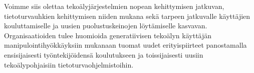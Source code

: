 \begin{otherlanguage}{finnish}
Voimme siis olettaa tekoälyjärjestelmien nopean kehittymisen jatkuvan, tietoturvauhkien kehittymisen niiden mukana sekä tarpeen jatkuvalle käyttäjien kouluttamiselle ja uusien puolustuskeinojen löytämiselle kasvavan. Organisaatioiden tulee huomioida generatiivisen tekoälyn käyttäjän manipulointihyökkäyksiin mukanaan tuomat uudet erityispiirteet panostamalla ensisijaisesti työntekijöidensä koulutukseen ja toissijaisesti uusiin tekoälypohjaisiin tietoturvaohjelmistoihin.





\end{otherlanguage}


